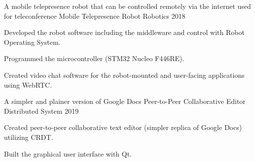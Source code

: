 

\begin{cventries}
    \cventry
        {A mobile telepresence robot that can be controlled remotely via the internet used for teleconference} %
        {Mobile Telepresence Robot} %
        {Robotics} %
        {2018} %
        {
            \begin{cvitems} %
                \item {Developed the robot software including the middleware and control with Robot Operating System.}
                \item {Programmed the microcontroller (STM32 Nucleo F446RE).}
                \item {Created video chat software for the robot-mounted and user-facing applications using WebRTC.}
            \end{cvitems}
        }
    
    \cventry
        {A simpler and plainer version of Google Docs} %
        {Peer-to-Peer Collaborative Editor} %
        {Distributed System} %
        {2019} %
        {
            \begin{cvitems} %
                \item {Created peer-to-peer collaborative text editor (simpler replica of Google Docs) utilizing CRDT.}
                \item {Built the graphical user interface with Qt.}
            \end{cvitems}
        }
\end{cventries}
